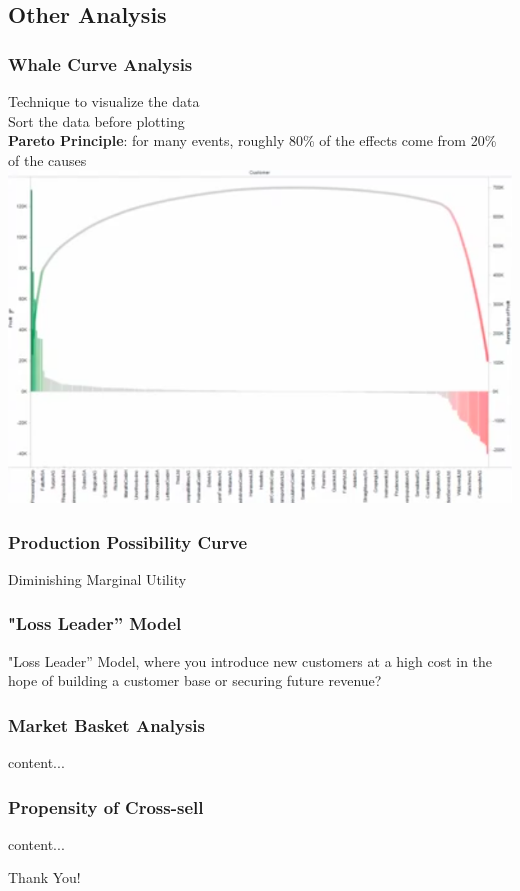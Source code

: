 \documentclass{beamer}
\begin{document}
\subsection{Other Analysis}
\begin{frame}\frametitle{Whale Curve Analysis}
Technique to visualize the data\\
Sort the data before plotting\\
\textbf{Pareto Principle}: for many events, roughly 80\% of the effects come from 20\% of the causes\\
\includegraphics[scale=0.3]{other/whalecurve}

\end{frame}


\begin{frame}\frametitle{Production Possibility Curve}
	Diminishing Marginal Utility\\
	
\end{frame}


\begin{frame}\frametitle{"Loss Leader” Model}

"Loss Leader” Model, where you introduce new customers at a high cost in the hope of building a customer base or securing future revenue? 

\end{frame}

\begin{frame}\frametitle{Market Basket Analysis}
content...
\end{frame}

\begin{frame}\frametitle{Propensity of Cross-sell}
content...
\end{frame}




\begin{frame}
\Huge{\centerline{Thank You!}}
\end{frame}

\end{document}
